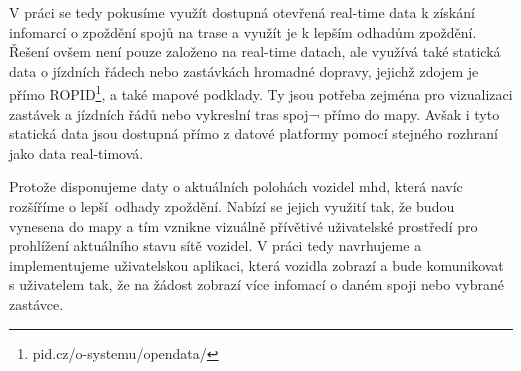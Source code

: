 \bigbreak

V práci se tedy pokusíme využít dostupná otevřená real-time data k získání infomarcí o zpoždění spojů na trase a využít je k lepším odhadům zpoždění. Řešení ovšem není pouze založeno na real-time datach, ale využívá také statická data o jízdních řádech nebo zastávkách hromadné dopravy, jejichž zdojem je přímo ROPID\footnote{pid.cz/o-systemu/opendata/}, a také mapové podklady. Ty jsou potřeba zejména pro vizualizaci zastávek a jízdních řádů nebo vykreslní tras spoj¬ přímo do mapy. Avšak i tyto statická data jsou dostupná přímo z datové platformy pomocí stejného rozhraní jako data real-timová.

\bigbreak

Protože disponujeme daty o aktuálních polohách vozidel \gls{mhd},  která navíc rozšíříme o lepší odhady zpoždění. Nabízí se jejich využití tak, že budou vynesena do mapy a tím vznikne vizuálně přívětivé uživatelské prostředí pro prohlížení aktuálního stavu sítě vozidel. V práci tedy navrhujeme a implementujeme uživatelskou aplikaci, která vozidla zobrazí a bude komunikovat s uživatelem tak, že na žádost zobrazí více infomací o daném spoji nebo vybrané zastávce.
